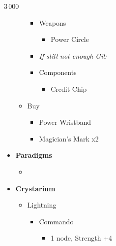 \begin{multicols}{2}
\begin{shop}{3\,000}
\begin{itemize}
\begin{itemize}
\begin{itemize}
                      \item Weapons
                            \begin{itemize}
                              \item Power Circle
                            \end{itemize}
                      \item \textit{If still not enough Gil:}
                      \item Components
                            \begin{itemize}
                              \item Credit Chip
                            \end{itemize}
                    \end{itemize}
              \item Buy
                    \begin{itemize}
                      \item Power Wristband
                      \item Magician's Mark x2
                    \end{itemize}
            \end{itemize}
    \end{itemize}
  \end{shop}
  \begin{menu}
    \begin{itemize}
      \item \textbf{Paradigms}
            \begin{itemize}
              \item {}%
                    {\paradigmline{(\rav)}{\rav}{\rav}}%
                    {\paradigmline{\com}{\sen}{\med}}%
                    {\paradigmline[3]{\textit{[\com]}}{\textit{\com}}{\textit{\rav}}}%
                    {\paradigmline{[\com]}{\com}{\rav}}
            \end{itemize}
      \item \textbf{Crystarium}
            \begin{itemize}
              \item Lightning
                    \begin{itemize}
                      \item Commando
                            \begin{itemize}
                              \item 1 node, Strength +4

\end{itemize}
\end{itemize}
\end{itemize}
\end{itemize}
\end{menu}
\end{multicols}
